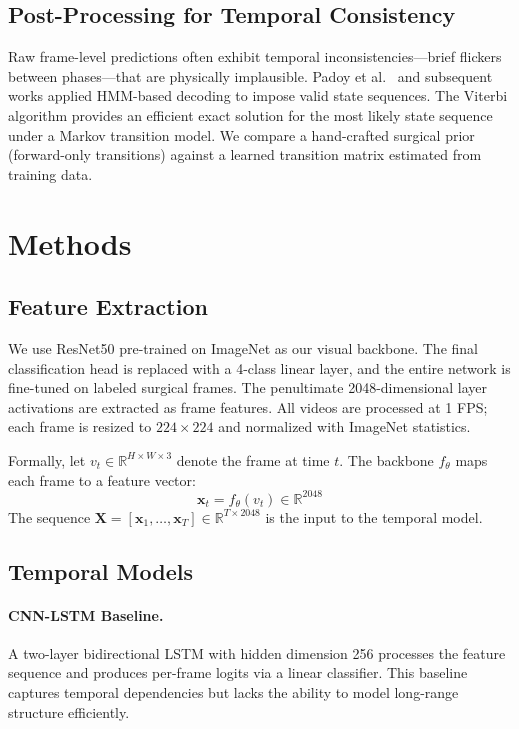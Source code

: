 \documentclass[10pt,twocolumn]{article}
\begin{document}
\subsection{Post-Processing for Temporal Consistency}

Raw frame-level predictions often exhibit temporal inconsistencies—brief flickers between phases—that are physically implausible. Padoy et al.\ \cite{padoy2012statistical} and subsequent works applied HMM-based decoding to impose valid state sequences. The Viterbi algorithm \cite{viterbi1967error} provides an efficient exact solution for the most likely state sequence under a Markov transition model. We compare a hand-crafted surgical prior (forward-only transitions) against a learned transition matrix estimated from training data.

\section{Methods}

\subsection{Feature Extraction}

We use ResNet50 \cite{he2016resnet} pre-trained on ImageNet \cite{deng2009imagenet} as our visual backbone. The final classification head is replaced with a 4-class linear layer, and the entire network is fine-tuned on labeled surgical frames. The penultimate 2048-dimensional layer activations are extracted as frame features. All videos are processed at 1 FPS; each frame is resized to $224 \times 224$ and normalized with ImageNet statistics.

Formally, let $v_t \in \mathbb{R}^{H \times W \times 3}$ denote the frame at time $t$. The backbone $f_\theta$ maps each frame to a feature vector:
\[
\mathbf{x}_t = f_\theta(v_t) \in \mathbb{R}^{2048}
\]
The sequence $\mathbf{X} = [\mathbf{x}_1, \ldots, \mathbf{x}_T] \in \mathbb{R}^{T \times 2048}$ is the input to the temporal model.

\subsection{Temporal Models}

\paragraph{CNN-LSTM Baseline.} A two-layer bidirectional LSTM with hidden dimension 256 processes the feature sequence and produces per-frame logits via a linear classifier. This baseline captures temporal dependencies but lacks the ability to model long-range structure efficiently.
\end{document}
